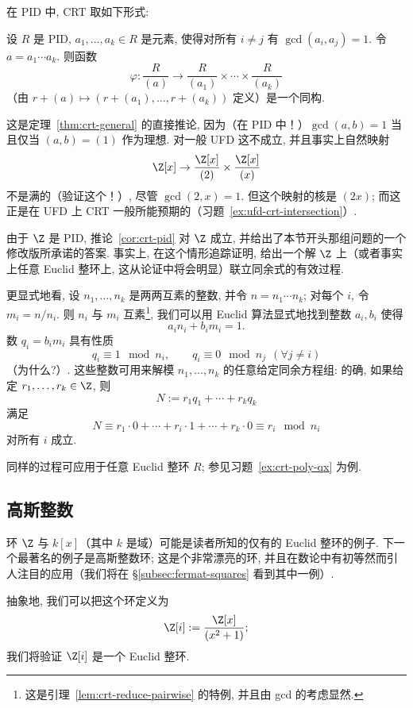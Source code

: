 在 PID 中, CRT 取如下形式:

\begin{corollary}\label{cor:crt-pid}
设 $R$ 是 PID, $a_1,\ldots,a_k\in R$ 是元素, 使得对所有 $i\neq j$ 有 $\gcd(a_i,a_j)=1$. 令 $a=a_1\cdots a_k$. 则函数
\[
\varphi:\frac{R}{(a)}\to\frac{R}{(a_1)}\times\cdots\times\frac{R}{(a_k)}
\]
（由 $r+(a)\mapsto (r+(a_1),\ldots,r+(a_k))$ 定义）是一个同构.
\end{corollary}

这是定理~\ref{thm:crt-general} 的直接推论, 因为（在 PID 中！）$\gcd(a,b)=1$ 当且仅当 $(a,b)=(1)$ 作为理想. 对一般 UFD 这不成立, 并且事实上自然映射
\[
\Z[x]\to\frac{\Z[x]}{(2)}\times\frac{\Z[x]}{(x)}
\]
不是满的（验证这个！）, 尽管 $\gcd(2,x)=1$. 但这个映射的核是 $(2x)$; 而这正是在 UFD 上 CRT 一般所能预期的（习题~\ref{ex:ufd-crt-intersection}）.

由于 $\Z$ 是 PID, 推论~\ref{cor:crt-pid} 对 $\Z$ 成立, 并给出了本节开头那组问题的一个修改版所承诺的答案. 事实上, 在这个情形追踪证明, 给出一个解 $\Z$ 上（或者事实上任意 Euclid 整环上, 这从论证中将会明显）联立同余式的有效过程.

更显式地看, 设 $n_1,\ldots,n_k$ 是两两互素的整数, 并令 $n=n_1\cdots n_k$; 对每个 $i$, 令 $m_i=n/n_i$. 则 $n_i$ 与 $m_i$ 互素\footnote{这是引理~\ref{lem:crt-reduce-pairwise} 的特例, 并且由 gcd 的考虑显然.}, 我们可以用 Euclid 算法显式地找到整数 $a_i,b_i$ 使得
\[
a_in_i+b_im_i=1.
\]
数 $q_i=b_im_i$ 具有性质
\[
q_i\equiv 1\mod n_i,\qquad q_i\equiv 0\mod n_j\ \ (\forall j\neq i)
\]
（为什么?）. 这些整数可用来解模 $n_1,\ldots,n_k$ 的任意给定同余方程组: 的确, 如果给定 $r_1,\ldots,r_k\in\Z$, 则
\[
N:=r_1q_1+\cdots+r_kq_k
\]
满足
\[
N\equiv r_1\cdot 0+\cdots+r_i\cdot 1+\cdots+r_k\cdot 0\equiv r_i\mod n_i
\]
对所有 $i$ 成立.

同样的过程可应用于任意 Euclid 整环 $R$; 参见习题~\ref{ex:crt-poly-qx} 为例.

\subsection{高斯整数}
\label{subsec:gaussian-integers}

环 $\Z$ 与 $k[x]$（其中 $k$ 是域）可能是读者所知的仅有的 Euclid 整环的例子. 下一个最著名的例子是高斯整数环; 这是个非常漂亮的环, 并且在数论中有初等然而引人注目的应用（我们将在 \S\ref{subsec:fermat-squares} 看到其中一例）.

抽象地, 我们可以把这个环定义为
\[
\Z[i]:=\frac{\Z[x]}{(x^2+1)};
\]
我们将验证 $\Z[i]$ 是一个 Euclid 整环.

